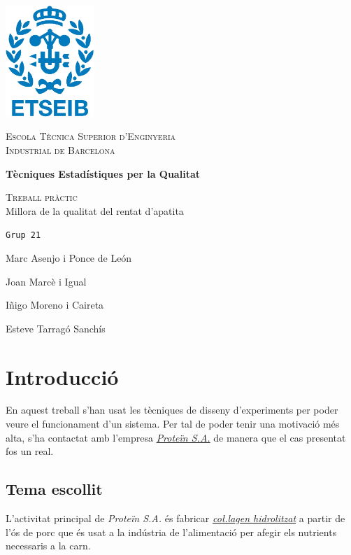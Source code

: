 \documentclass[a4paper]{article}
\begin{document}
\begin{titlepage}
	\centering
	\vspace{1cm}
	\includegraphics[width=0.25\textwidth]{images/etseib}
	\par\vspace{1cm}
	\textsc{ \LARGE Escola Tècnica Superior d'Enginyeria \\[1em] 
		Industrial de Barcelona}
	\par\vspace{2cm}
	\textbf{\Huge Tècniques Estadístiques per la Qualitat}
	\par\vspace{2cm}
	{\LARGE \textsc{Treball pràctic} \\[1em] Millora de la qualitat del rentat d'apatita}
	\vfill
	\begin{flushright}
		\large
		\texttt{Grup 21} \par
		Marc Asenjo i Ponce de León \par
		Joan Marcè i Igual \par
		Iñigo Moreno i Caireta \par
		Esteve Tarragó Sanchís \par
	\end{flushright}
\end{titlepage}

\tableofcontents
\pagebreak

\section{Introducció}
En aquest treball s'han usat les tècniques de disseny d'experiments per poder veure el funcionament d'un sistema. Per tal de poder tenir una motivació més alta, s'ha contactat amb l'empresa \emph{\href{http://www.protein.es/}{Proteïn S.A.}} de manera que el cas presentat fos un real. 

\subsection{Tema escollit}
L'activitat principal de \emph{Proteïn S.A.} és fabricar  \emph{\href{https://es.wikipedia.org/wiki/Col\%C3\%A1geno_hidrolizado}{co\l.lagen hidrolitzat}} a partir de l'ós de porc que és usat a la indústria de l'alimentació per afegir els nutrients necessaris a la carn. 
\end{document}
